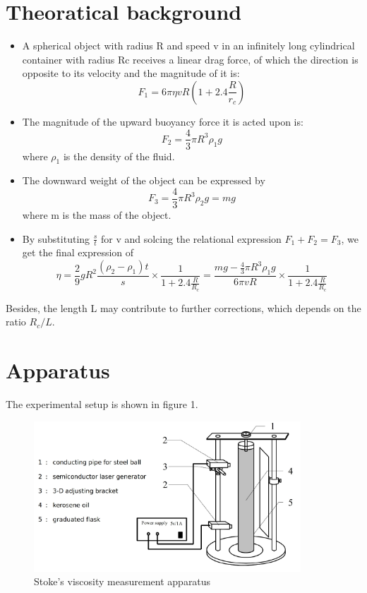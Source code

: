 \documentclass[12pt,a4paper]{article}
\begin{document}
\section{Theoratical background}
\begin{itemize}
    \item A spherical object with radius R and speed v in an infinitely long cylindrical container with radius Rc receives a linear drag force, of which the direction is opposite to its velocity and the magnitude of it is:$$F_1=6\pi\eta vR(1+2.4\frac{R}{r_c})$$
    \item The magnitude of the upward buoyancy force it is acted upon is:$$F_2=\frac{4}{3}\pi R^3\rho_1g$$ where $\rho_1$ is the density of the fluid.
    \item The downward weight of the object can be expressed by$$F_3=\frac{4}{3}\pi R^3\rho_2g=mg$$ where m is the mass of the object.
    \item By substituting $\frac{s}{t}$ for v and solcing the relational expression $F_1+F_2=F_3$, we get the final expression of $$\eta=\frac{2}{9}gR^2\frac{(\rho_2-\rho_1)t}{s}\times\frac{1}{1+2.4\frac{R}{R_c}}=\frac{mg-\frac{4}{3}\pi R^3\rho_1g}{6\pi vR}\times \frac{1}{1+2.4\frac{R}{R_c}}$$
\end{itemize}
Besides, the length L may contribute to further corrections, which depends on the ratio
$R_c/L$.

\section{Apparatus}
The experimental setup is shown in figure 1.

\begin{figure}[h]
    \centering
    \includegraphics[width=10cm]{apparatus.png}
    \caption{Stoke's viscosity measurement apparatus}
\end{figure}
\end{document}
